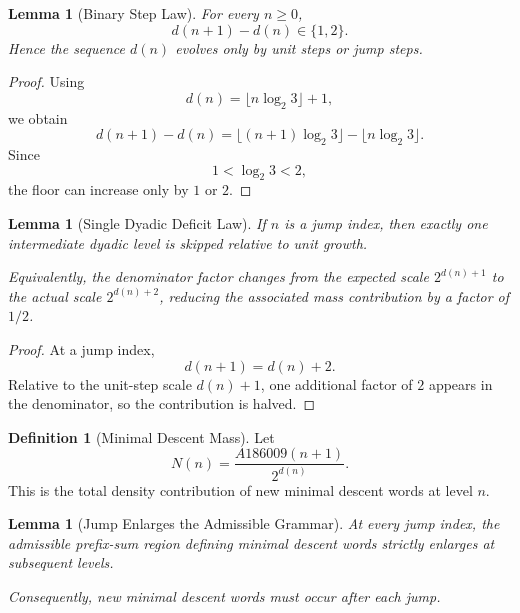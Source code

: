 \documentclass[12pt, oneside]{article}
\numberwithin{equation}{section}
\theoremstyle{definition}
\newtheorem{definition}{Definition}[section]
\theoremstyle{plain}
\newtheorem{lemma}[theorem]{Lemma}
\theoremstyle{remark}
\begin{document}

\begin{lemma}[Binary Step Law]
\label{lem:binary-step}
For every $n\ge0$,
\[
d(n+1)-d(n)\in\{1,2\}.
\]
Hence the sequence $d(n)$ evolves only by unit steps or jump steps.
\end{lemma}

\begin{proof}
Using
\[
d(n)=\lfloor n\log_2 3\rfloor+1,
\]
we obtain
\[
d(n+1)-d(n)
=
\lfloor (n+1)\log_2 3\rfloor-\lfloor n\log_2 3\rfloor.
\]
Since
\[
1<\log_2 3<2,
\]
the floor can increase only by $1$ or $2$.
\end{proof}


\begin{lemma}[Single Dyadic Deficit Law]
\label{lem:deficit-law}
If $n$ is a jump index, then exactly one intermediate dyadic level is
skipped relative to unit growth.

Equivalently, the denominator factor changes from the expected scale
$2^{d(n)+1}$ to the actual scale $2^{d(n)+2}$, reducing the associated
mass contribution by a factor of $1/2$.
\end{lemma}

\begin{proof}
At a jump index,
\[
d(n+1)=d(n)+2.
\]
Relative to the unit-step scale $d(n)+1$, one additional factor of $2$
appears in the denominator, so the contribution is halved.
\end{proof}


\begin{definition}[Minimal Descent Mass]
Let
\[
N(n)=\frac{A186009(n+1)}{2^{d(n)}}.
\]
This is the total density contribution of new minimal descent words at
level $n$.
\end{definition}


\begin{lemma}[Jump Enlarges the Admissible Grammar]
\label{lem:jump-grammar}
At every jump index, the admissible prefix-sum region defining minimal
descent words strictly enlarges at subsequent levels.

Consequently, new minimal descent words must occur after each jump.
\end{lemma}
\end{document}
